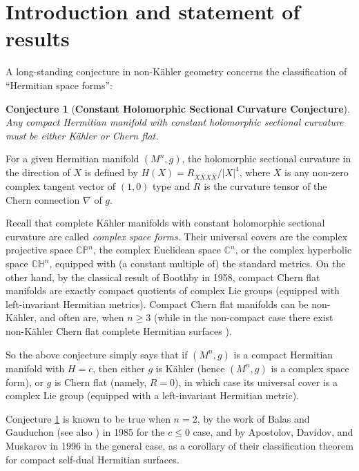 \documentclass{amsart}
\newtheorem{conjecture}{Conjecture}
\begin{document}
\tableofcontents




\section{Introduction and statement of results}\label{intro}


A long-standing conjecture in non-K\"ahler geometry concerns the classification of ``Hermitian space forms'':



\begin{conjecture}[{\bf Constant Holomorphic Sectional Curvature Conjecture}] \label{conj1}
Any compact Hermitian manifold with constant holomorphic sectional curvature must be either K\"ahler or Chern flat.
\end{conjecture}

For a given Hermitian manifold $(M^n,g)$, the holomorphic sectional curvature in the direction of $X$ is  defined by
$ H(X) = R_{X\bar{X}X\bar{X}}/|X|^4$,
where $X$ is any non-zero complex tangent vector of $(1,0)$ type and $R$ is the curvature tensor of the Chern connection $\nabla$ of $g$.

Recall that complete K\"ahler manifolds with constant holomorphic sectional curvature are called {\em complex space forms}. Their universal covers are the complex projective space ${\mathbb C}{\mathbb P}^n$, the complex Euclidean space ${\mathbb C}^n$, or the complex hyperbolic space ${\mathbb C}{\mathbb H}^n$, equipped with (a constant multiple of) the standard metrics. On the other hand, by the classical result of Boothby \cite{Boothby} in 1958, compact Chern flat manifolds are exactly compact quotients of complex Lie groups (equipped with left-invariant Hermitian metrics). Compact Chern flat manifolds can be non-K\"ahler, and often are, when $n\geq 3$ (while in the non-compact case there exist  non-K\"ahler Chern flat complete Hermitian surfaces \cite{YangZ}).

So the above conjecture simply says that if $(M^n,g)$ is a compact Hermitian manifold with $H=c$, then either $g$ is K\"ahler (hence $(M^n,g)$ is a complex space form), or $g$ is Chern flat (namely, $R=0$), in which case its universal cover is a complex Lie group (equipped with a left-invariant Hermitian metric).

Conjecture \ref{conj1} is known to be true when $n=2$, by the work of Balas and Gauduchon \cite{BG} (see also \cite{Balas}) in 1985 for the $c\leq 0$ case, and by
Apostolov, Davidov, and Muskarov \cite{ADM} in 1996 in the general case, as a corollary of their classification theorem for compact self-dual Hermitian surfaces.
\end{document}
